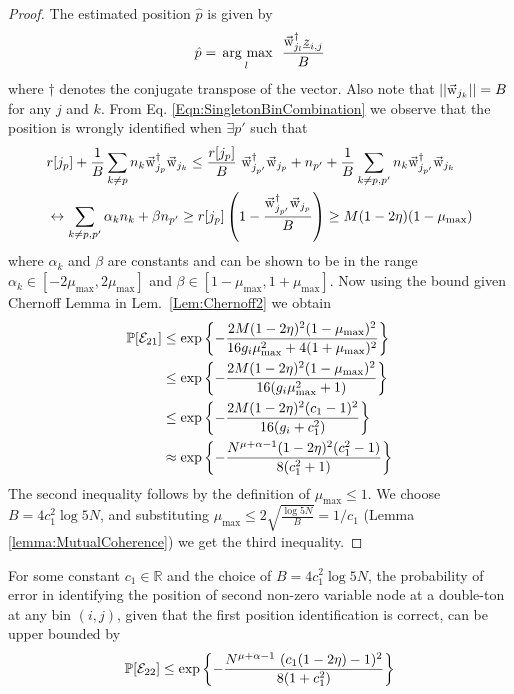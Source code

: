 \begin{proof}
	The estimated position $\hat{p}$ is given by
	\begin{align}
	\label{Eqn:SingletonBinCombination}
	\hat{p}= \underset{l}{\operatorname*{\,arg\ max}}~~ \frac{\vec{\mathrm{w}}_{j_l}^{\dagger}\underline{z}_{i,j}}{B}
	\end{align}
	where $\dagger$ denotes the conjugate transpose of the vector. Also note that $|| \vec{\mathrm{w}}_{j_k}||=B$ for any $j$ and $k$.  From Eq. \eqref{Eqn:SingletonBinCombination} we observe that the position is wrongly identified when $\exists p'$ such that
	\begin{align*}
	&r[j_p] + \frac{1}{B}\sum_{k \neq p} n_k 	\vec{\mathrm{w}}_{j_p}^{\dagger}\vec{\mathrm{w}}_{j_k} \leq \frac{r[j_p]}{B} ~ \vec{\mathrm{w}}_{j_{p'}}^{\dagger}\vec{\mathrm{w}}_{j_p}+ n_{p'}+\frac{1}{B}\sum_{k \neq p,p'}n_k\vec{\mathrm{w}}_{j_{p'}}^{\dagger} \vec{\mathrm{w}}_{j_k} \\
	&\leftrightarrow \sum_{k \neq p,p'}\alpha_k n_k+\beta n_{p'}\geq  r[j_p]\left(1-\frac{\vec{\mathrm{w}}_{j_{p'}}^{\dagger}\vec{\mathrm{w}}_{j_p}}{B}\right)\geq M(1-2\eta)(1-\mu_{\text{max}})
	\end{align*}
	where $\alpha_k$ and $\beta$ are constants and can be shown to be in the range $\alpha_k\in[-2\mu_\text{max},2\mu_\text{max}]$ and $\beta\in[1-\mu_\text{max},1+\mu_\text{max}]$. Now using the bound given Chernoff Lemma in Lem.~\ref{Lem:Chernoff2} we obtain
	\begin{align*}
	\mathbb{P}[\mathcal{E}_{21}]&\leq \exp\left\lbrace-\frac{2M(1-2\eta)^2(1-\mu_{\text{max}})^2}{16g_i\mu^2_{\max}+4(1+\mu_{\max})^2}\right\rbrace\\
	&\leq\exp\left\lbrace-\frac{2M(1-2\eta)^2(1-\mu_{\text{max}})^2}{16(g_i\mu^2_{\max}+1)}\right\rbrace\\
	&\leq\exp\left\lbrace-\frac{2M(1-2\eta)^2(c_1-1)^2}{16(g_i+c_1^2)}\right\rbrace\\
	&\approx\exp\left\lbrace-\frac{N^{\mu+\alpha-1}(1-2\eta)^2(c_1^2-1)}{8(c_1^2+1)}\right\rbrace\\
	\end{align*}
	The second inequality follows by the definition of  $\mu_{\text{max}} \leq 1$.  We choose $B=4c_1^2\log 5N$, and substituting $\mu_{\max}\leq 2\sqrt{\frac{\log 5N}{B}} = 1/c_1$ (Lemma \ref{lemma:MutualCoherence}) we get the third inequality.
	
\end{proof}
\begin{lemma}
For some constant $c_1 \in \mathbb{R}$ and the choice of $B=4c_1^2\log 5N$, the probability of error in identifying the position of second non-zero variable node at a double-ton at any bin $(i,j)$, given that the first position identification is correct, can be upper bounded by
	\begin{align*}
		\mathbb{P}[\mathcal{E}_{22}]\leq \exp\left\lbrace-\frac{N^{\mu+\alpha-1} ~ (c_1(1 - 2\eta) - 1)^2}{8(1+ c_1^2)}\right\rbrace
	\end{align*}
\end{lemma}
